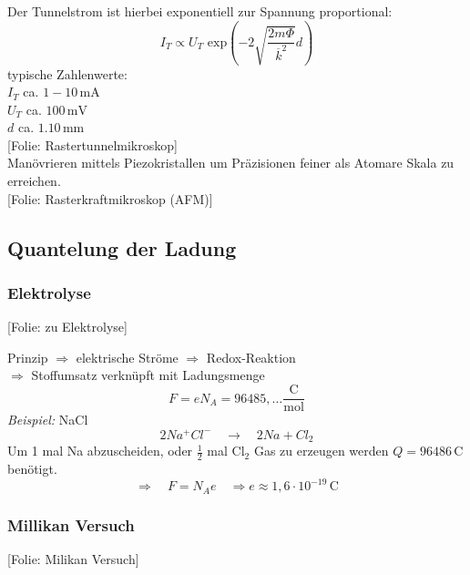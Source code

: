 \documentclass[titlepage,11pt,a4paper,ngerman]{report}
\newcommand{\tx}[1]{\textrm{#1}}
\newcommand{\ol}[1]{\overline{#1}}
\renewcommand{\Phi}{\varPhi}
\newcommand{\folie}[1]{\color{gray}[Folie: #1]\color{black}}
\newcommand{\lcom}[1]{\color{MidnightBlue}#1\color{black}}
\begin{document}
Der Tunnelstrom ist hierbei exponentiell zur Spannung proportional:
\begin{equation*}
I_T \propto U_T \tx{ exp}\left(- 2\sqrt{\frac{2 m \Phi}{\ol{k}^2}} d \right)
\end{equation*}
typische Zahlenwerte:\\
$ I_T $ ca. $ 1 - 10 \, \tx{mA} $\\
$ U_T $ ca. $ 100 \, \tx{mV} $\\
$ d $ ca. $ 1 . 10 \, \tx{mm} $\\
\folie{Rastertunnelmikroskop}\\
\lcom{Manövrieren mittels Piezokristallen um Präzisionen feiner als Atomare Skala zu erreichen.}\\
\folie{Rasterkraftmikroskop (AFM)}


\subsection{Quantelung der Ladung}

\subsubsection{Elektrolyse}

\folie{zu Elektrolyse}

Prinzip $ \Rightarrow $ elektrische Ströme $ \Rightarrow $ Redox-Reaktion\\
$ \Rightarrow $ Stoffumsatz verknüpft mit Ladungsmenge
\begin{equation*}
F = e N_A = 96485{,}\dots \frac{\tx{C}}{\tx{mol}}
\end{equation*}
\emph{Beispiel:} NaCl
\begin{equation*}
2 Na^+ Cl^- \quad \rightarrow \quad 2 Na + Cl_2
\end{equation*}
Um 1 mal Na abzuscheiden, oder $ \frac{1}{2} $ mal Cl$ _2 $ Gas zu erzeugen werden $ Q = 96486 \, \tx{C} $ benötigt.
\begin{equation*}
\Rightarrow \quad F = N_A e \quad \Rightarrow e \approx 1{,}6 \cdot 10^{-19} \, \tx{C} 
\end{equation*}

\subsubsection{Millikan Versuch}

\folie{Milikan Versuch}
\end{document}
